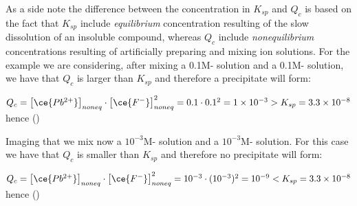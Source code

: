 \documentclass[main.tex]{subfiles}
\begin{document}
\begin{description}
 \begin{center}  \end{center}
As a side note the difference between the concentration in $K_{sp}$ and $Q_c$ is based on the fact that $K_{sp}$ include \emph{equilibrium} concentration resulting of the slow dissolution of an insoluble compound, whereas $Q_c$ include \emph{nonequilibrium} concentrations resulting of artificially preparing and mixing ion solutions. For the example we are considering, after mixing a 0.1M- solution and a 0.1M- solution, we have that  $Q_c$ is larger than $K_{sp}$ and therefore a precipitate will form:
\begin{center} $Q_{c}= \big[ \ce{Pb^{2+}} \big]_{noneq}\cdot \big[ \ce{F^{-}} \big]^2_{noneq}=0.1\cdot 0.1^2=1\times 10^{-3}>K_{sp}=3.3\times10^{-8}$ hence ()\end{center}
Imaging that we mix now a $10^{-3}$M- solution and a $10^{-3}$M- solution. For this case we have that $Q_c$ is smaller than $K_{sp}$ and therefore no precipitate will form:
\begin{center} $Q_{c}= \big[ \ce{Pb^{2+}} \big]_{noneq}\cdot \big[ \ce{F^{-}} \big]^2_{noneq}=10^{-3}\cdot (10^{-3})^2=10^{-9}<K_{sp}=3.3\times10^{-8}$ hence ()\end{center}




\end{description}
\end{document}
